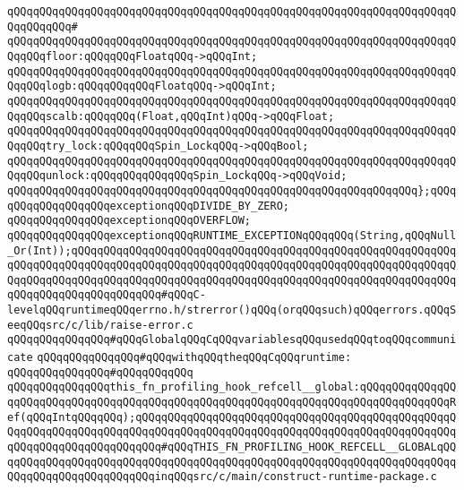 \verb|qQQqqQQqqQQqqQQqqQQqqQQqqQQqqQQqqQQqqQQqqQQqqQQqqQQqqQQqqQQqqQQqqQQqqQQqqQQqqQQq#|\newline
\verb|qQQqqQQqqQQqqQQqqQQqqQQqqQQqqQQqqQQqqQQqqQQqqQQqqQQqqQQqqQQqqQQqqQQqqQQqqQQqfloor:qQQqqQQqFloatqQQq->qQQqInt;|\newline
\verb|qQQqqQQqqQQqqQQqqQQqqQQqqQQqqQQqqQQqqQQqqQQqqQQqqQQqqQQqqQQqqQQqqQQqqQQqqQQqlogb:qQQqqQQqqQQqFloatqQQq->qQQqInt;|\newline
\verb|qQQqqQQqqQQqqQQqqQQqqQQqqQQqqQQqqQQqqQQqqQQqqQQqqQQqqQQqqQQqqQQqqQQqqQQqqQQqscalb:qQQqqQQq(Float,qQQqInt)qQQq->qQQqFloat;|\newline
\verb|qQQqqQQqqQQqqQQqqQQqqQQqqQQqqQQqqQQqqQQqqQQqqQQqqQQqqQQqqQQqqQQqqQQqqQQqqQQqtry_lock:qQQqqQQqSpin_LockqQQq->qQQqBool;|\newline
\verb|qQQqqQQqqQQqqQQqqQQqqQQqqQQqqQQqqQQqqQQqqQQqqQQqqQQqqQQqqQQqqQQqqQQqqQQqqQQqunlock:qQQqqQQqqQQqqQQqSpin_LockqQQq->qQQqVoid;|\newline
\verb|qQQqqQQqqQQqqQQqqQQqqQQqqQQqqQQqqQQqqQQqqQQqqQQqqQQqqQQqqQQqqQQq};qQQq|\newline
\newline
\verb|qQQqqQQqqQQqqQQqexceptionqQQqDIVIDE_BY_ZERO;|\newline
\verb|qQQqqQQqqQQqqQQqexceptionqQQqOVERFLOW;|\newline
\verb|qQQqqQQqqQQqqQQqexceptionqQQqRUNTIME_EXCEPTIONqQQqqQQq(String,qQQqNull_Or(Int));qQQqqQQqqQQqqQQqqQQqqQQqqQQqqQQqqQQqqQQqqQQqqQQqqQQqqQQqqQQqqQQqqQQqqQQqqQQqqQQqqQQqqQQqqQQqqQQqqQQqqQQqqQQqqQQqqQQqqQQqqQQqqQQqqQQqqQQqqQQqqQQqqQQqqQQqqQQqqQQqqQQqqQQqqQQqqQQqqQQqqQQqqQQqqQQqqQQqqQQqqQQqqQQqqQQqqQQqqQQqqQQq#qQQqC-levelqQQqruntimeqQQqerrno.h/strerror()qQQq(orqQQqsuch)qQQqerrors.qQQqSeeqQQqsrc/c/lib/raise-error.c|\newline
\newline
\verb|qQQqqQQqqQQqqQQq#qQQqGlobalqQQqCqQQqvariablesqQQqusedqQQqtoqQQqcommunicate|\newline
\verb|qQQqqQQqqQQqqQQq#qQQqwithqQQqtheqQQqCqQQqruntime:|\newline
\verb|qQQqqQQqqQQqqQQq#qQQqqQQqqQQq|\newline
\verb|qQQqqQQqqQQqqQQqthis_fn_profiling_hook_refcell__global:qQQqqQQqqQQqqQQqqQQqqQQqqQQqqQQqqQQqqQQqqQQqqQQqqQQqqQQqqQQqqQQqqQQqqQQqqQQqqQQqqQQqRef(qQQqIntqQQqqQQq);qQQqqQQqqQQqqQQqqQQqqQQqqQQqqQQqqQQqqQQqqQQqqQQqqQQqqQQqqQQqqQQqqQQqqQQqqQQqqQQqqQQqqQQqqQQqqQQqqQQqqQQqqQQqqQQqqQQqqQQqqQQqqQQqqQQqqQQqqQQqqQQq#qQQqTHIS_FN_PROFILING_HOOK_REFCELL__GLOBALqQQqqQQqqQQqqQQqqQQqqQQqqQQqqQQqqQQqqQQqqQQqqQQqqQQqqQQqqQQqqQQqqQQqqQQqqQQqqQQqqQQqqQQqqQQqqQQqinqQQqsrc/c/main/construct-runtime-package.c|\newline
